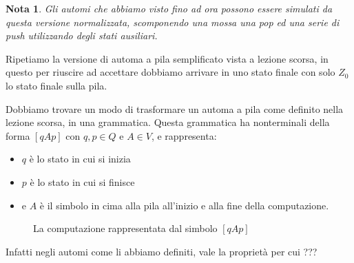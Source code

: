 \documentclass[12pt]{report}
\newtheorem{nota}{Nota}
\begin{document}
\begin{nota}
	Gli automi che abbiamo visto fino ad ora possono essere simulati da questa versione normalizzata, scomponendo una mossa una pop ed una serie di push utilizzando degli stati ausiliari.
\end{nota}

Ripetiamo la versione di automa a pila semplificato vista a lezione scorsa, in questo per riuscire ad accettare dobbiamo arrivare in uno stato finale con solo $Z_0$ lo stato finale sulla pila.

Dobbiamo trovare un modo di trasformare un automa a pila come definito nella lezione scorsa, in una grammatica.
Questa grammatica ha nonterminali della forma $[qAp]$ con $q, p \in Q$ e $A \in V$, e rappresenta:
\begin{itemize}
	\item $q$ è lo stato in cui si inizia
	\item $p$ è lo stato in cui si finisce 
	\item e $A$ è il simbolo in cima alla pila all'inizio e alla fine della computazione.
\end{itemize}
\begin{figure}[H]
	\centering
	\caption{La computazione rappresentata dal simbolo $[qAp]$}
\end{figure}
Infatti negli automi come li abbiamo definiti, vale la proprietà per cui ??? %
\end{document}
